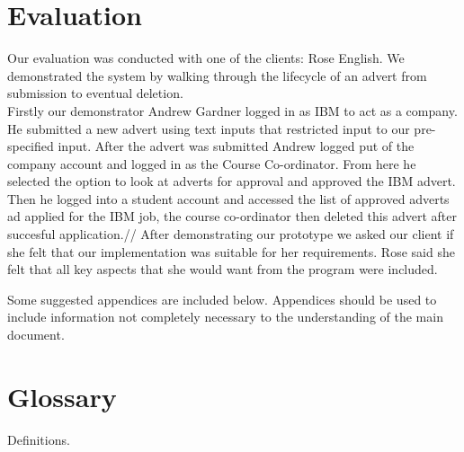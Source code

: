 \documentclass{l3deliverable}
\begin{document}
\section{Evaluation}

Our evaluation was conducted with one of the clients: Rose English. We demonstrated the system by walking through the lifecycle of an advert from submission to eventual deletion.\\
Firstly our demonstrator Andrew Gardner logged in as IBM to act as a company. He submitted a new advert using text inputs that restricted input to our pre-specified input. After the advert was submitted Andrew logged put of the company account and logged in as the Course Co-ordinator. From here he selected the option to look at adverts for approval and approved the IBM advert. Then he logged into a student account and accessed the list of approved adverts ad applied for the IBM job, the course co-ordinator then deleted this advert after succesful application.//
After demonstrating our prototype we asked our client if she felt that our implementation was suitable for her requirements. Rose said she felt that all key aspects that she would want from the program were included.\\


\appendix

Some suggested appendices are included below. Appendices should be
used to include information not completely necessary to the
understanding of the main document.


\section{Glossary}

Definitions.

\end{document}
